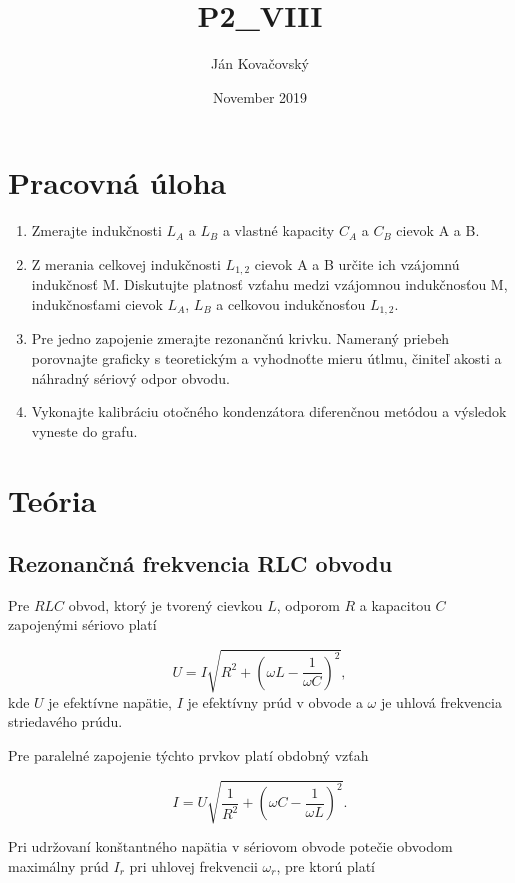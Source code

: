 \documentclass{article}
\title{P2_VIII}
\author{Ján Kovačovský}
\date{November 2019}
\begin{document}
\renewcommand{\thefootnote}{\arabic{footnote}}



\section{Pracovná úloha}
\begin{enumerate}
    \item Zmerajte indukčnosti $L_A$ a $L_B$ a vlastné kapacity $C_A$ a $C_B$ cievok A a B.
    \item Z merania celkovej indukčnosti $L_{1,2}$ cievok A a B určite ich vzájomnú indukčnosť M. Diskutujte platnosť vzťahu medzi vzájomnou indukčnosťou M, indukčnosťami cievok $L_A$, $L_B$ a celkovou indukčnosťou $L_{1,2}$.
    \item Pre jedno zapojenie zmerajte rezonančnú krivku. Nameraný priebeh porovnajte graficky s teoretickým a vyhodnoťte mieru útlmu, činiteľ akosti a náhradný sériový odpor obvodu. 
    \item  Vykonajte kalibráciu otočného kondenzátora diferenčnou metódou a výsledok vyneste do grafu.
\end{enumerate}

\section{Teória}
\subsection{Rezonančná frekvencia RLC obvodu}
Pre $RLC$ obvod, ktorý je tvorený cievkou $L$, odporom $R$ a kapacitou $C$ zapojenými sériovo platí \cite{2}

\begin{equation}
    U = I\sqrt{R^2 + \left({\omega}L - \frac{1}{{\omega}C}\right)^2},
\end{equation}
kde $U$ je efektívne napätie, $I$ je efektívny prúd v obvode a $\omega$ je uhlová frekvencia striedavého prúdu. 

Pre paralelné zapojenie týchto prvkov platí obdobný vzťah 

\begin{equation}
    I = U\sqrt{\frac{1}{R^2} + \left({\omega}C - \frac{1}{{\omega}L}\right)^2}.
\end{equation}

Pri udržovaní konštantného napätia v sériovom obvode potečie obvodom maximálny prúd $I_r$ pri uhlovej frekvencii ${\omega}_r$, pre ktorú platí \cite{2}
\end{document}
